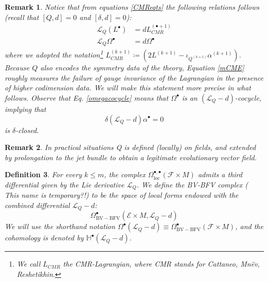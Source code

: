 \documentclass[a4paper,reqno]{amsart}
\newtheorem{definition}{Definition}
\newtheorem{remark}[definition]{Remark}
\newcommand{\LQ}{\mathcal{L}_{Q}}
\begin{document}
\begin{remark}\label{otherrelations}
Notice that from equations \eqref{CMReqts} the following relations follows (recall that $[Q,d]=0$ and $[\delta,d]=0$): 
\begin{subequations}\begin{align}\label{mCME}
\LQ\left(L^{\bullet}\right)& = dL_{CMR}^{(\bullet+1)}\\ \label{omegacocycle}
\LQ \Omega^\bullet & = d\Omega^\bullet 
\end{align}\end{subequations}
where we adopted the notation\footnote{We call $L_{CMR}$ the CMR-Lagrangian, where CMR stands for Cattaneo, Mn\"ev, Reshetikhin.} $L^{(k+1)}_{CMR}\coloneqq \left(2L^{(k+1)} - \iota_{Q^{(k+1)}}\alpha^{(k+1)}\right)$. Because $Q$ also encodes the symmetry data of the theory, Equation \eqref{mCME} roughly measures the failure of gauge invariance of the Lagrangian in the presence of higher codimension data. We will make this statement more precise in what follows. 
Observe that Eq. \eqref{omegacocycle} means that $\Omega^\bullet$ is an $(\LQ - d)$-cocycle, implying that 
$$\delta (\LQ - d)\alpha^\bullet=0$$ 
is $\delta$-closed. 

\end{remark}


\begin{remark}
In practical situations Q is defined (locally) on \emph{fields}, and extended by prolongation to the jet bundle to obtain a legitimate evolutionary vector field.
\end{remark}



\begin{definition}
For every $k\leq m$, the complex $\Omega^{\bullet,\bullet}_{\mathrm{loc}}(\mathcal{F}\times M)$ admits a third differential given by the Lie derivative $\LQ$. We define the BV-BFV complex ({\color{red} This name is temporary?!}) to be the space of local forms endowed with the combined differential $\LQ - d$:
\begin{equation}
\Omega_{\mathrm{BV-BFV}}^{\bullet}(\mathcal{E}\times M, \LQ - d)
\end{equation}
We will use the shorthand notation $\mathbb{\Omega}^{\bullet}(\LQ - d)\equiv\Omega_{\mathrm{BV-BFV}}^{\bullet}(\mathcal{F}\times M)$, and the cohomology is denoted by $\mathbb{H}^\bullet(\LQ - d)$.
\end{definition}
\end{document}
